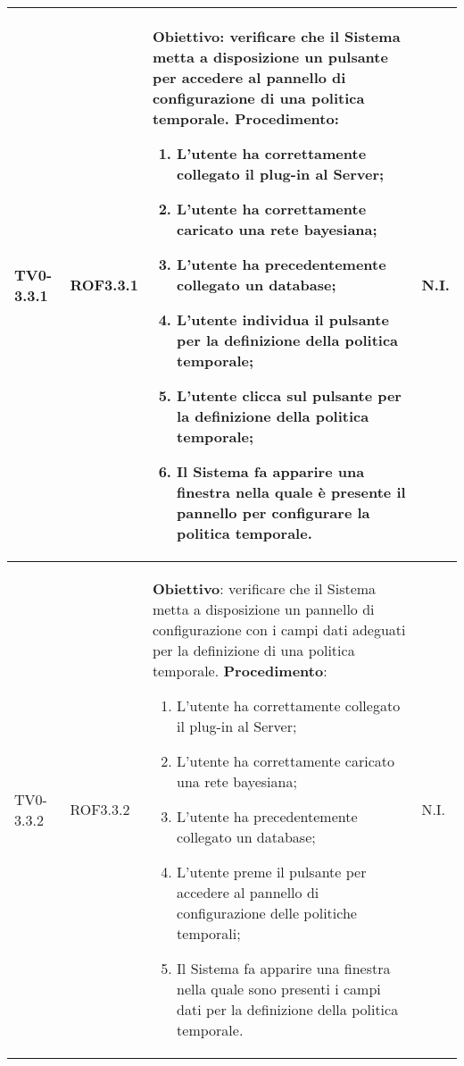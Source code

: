 \begin{longtable}{|C{.15\textwidth}|C{.13\textwidth}|m{.52\textwidth}|C{.08\textwidth}|}
TV0-3.3.1 & ROF3.3.1 &
	\textbf{Obiettivo}: verificare che il Sistema metta a disposizione un pulsante per accedere al pannello di configurazione di una politica temporale. \newline
	\textbf{Procedimento}:
	\begin{enumerate}
		\item L'utente ha correttamente collegato il plug-in al Server;
		\item L'utente ha correttamente caricato una rete bayesiana;
		\item L'utente ha precedentemente collegato un database;
		\item L'utente individua il pulsante per la definizione della politica temporale;
		\item L'utente clicca sul pulsante per la definizione della politica temporale;
		\item Il Sistema fa apparire una finestra nella quale è presente il pannello per configurare la politica temporale.
	\end{enumerate}
	& N.I. \\
\hline

TV0-3.3.2 & ROF3.3.2 &
	\textbf{Obiettivo}: verificare che il Sistema metta a disposizione un pannello di configurazione con i campi dati adeguati per la definizione di una politica temporale. \newline
	\textbf{Procedimento}:
	\begin{enumerate}
		\item L'utente ha correttamente collegato il plug-in al Server;
		\item L'utente ha correttamente caricato una rete bayesiana;
		\item L'utente ha precedentemente collegato un database;
		\item L'utente preme il pulsante per accedere al pannello di configurazione delle politiche temporali;
		\item Il Sistema fa apparire una finestra nella quale sono presenti i campi dati per la definizione della politica temporale.
	\end{enumerate}
	& N.I. \\
\hline


\end{longtable}
